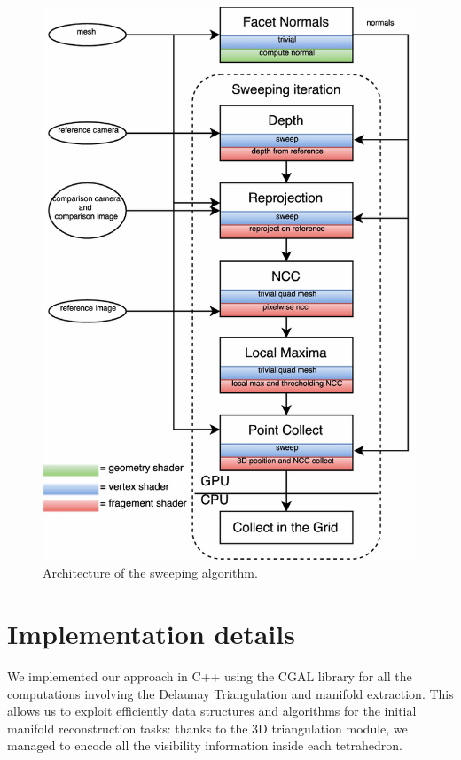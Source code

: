 \begin{figure}[tp]
\centering
\includegraphics[height=0.83\textheight]{./img/ch-sweep/Sweep-shaders-architecture}
\caption{Architecture of the sweeping algorithm.}
\label{fig:sweep-arch}
\end{figure}

\section{Implementation details}
We implemented our approach in C++ using the CGAL library \cite{cgal} for all the computations involving the Delaunay Triangulation and manifold extraction. This allows us to exploit efficiently data structures and algorithms for the initial manifold reconstruction tasks: thanks to the 3D triangulation module, we managed to encode all the visibility information inside each tetrahedron.


